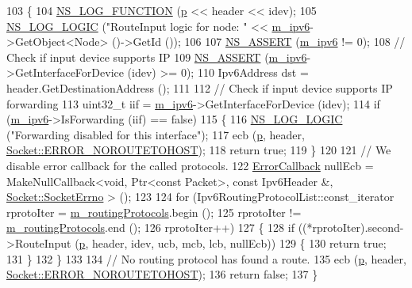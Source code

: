 \begin{DoxyCode}
103 \{
104   \hyperlink{log-macros-disabled_8h_a90b90d5bad1f39cb1b64923ea94c0761}{NS\_LOG\_FUNCTION} (\hyperlink{lte__link__budget_8m_ac9de518908a968428863f829398a4e62}{p} << header << idev);
105   \hyperlink{group__logging_ga88acd260151caf2db9c0fc84997f45ce}{NS\_LOG\_LOGIC} (\textcolor{stringliteral}{"RouteInput logic for node: "} << \hyperlink{classns3_1_1Ipv6ListRouting_af82ea298d92eb8cfcb6c7572e32b517d}{m\_ipv6}->GetObject<Node> ()->GetId ());
106 
107   \hyperlink{assert_8h_a6dccdb0de9b252f60088ce281c49d052}{NS\_ASSERT} (\hyperlink{classns3_1_1Ipv6ListRouting_af82ea298d92eb8cfcb6c7572e32b517d}{m\_ipv6} != 0);
108   \textcolor{comment}{// Check if input device supports IP}
109   \hyperlink{assert_8h_a6dccdb0de9b252f60088ce281c49d052}{NS\_ASSERT} (\hyperlink{classns3_1_1Ipv6ListRouting_af82ea298d92eb8cfcb6c7572e32b517d}{m\_ipv6}->GetInterfaceForDevice (idev) >= 0);
110   Ipv6Address dst = header.GetDestinationAddress ();
111 
112   \textcolor{comment}{// Check if input device supports IP forwarding}
113   uint32\_t iif = \hyperlink{classns3_1_1Ipv6ListRouting_af82ea298d92eb8cfcb6c7572e32b517d}{m\_ipv6}->GetInterfaceForDevice (idev);
114   \textcolor{keywordflow}{if} (\hyperlink{classns3_1_1Ipv6ListRouting_af82ea298d92eb8cfcb6c7572e32b517d}{m\_ipv6}->IsForwarding (iif) == \textcolor{keyword}{false})
115     \{
116       \hyperlink{group__logging_ga88acd260151caf2db9c0fc84997f45ce}{NS\_LOG\_LOGIC} (\textcolor{stringliteral}{"Forwarding disabled for this interface"});
117       ecb (\hyperlink{lte__link__budget_8m_ac9de518908a968428863f829398a4e62}{p}, header, \hyperlink{classns3_1_1Socket_ada1328c5ae0c28cb2a982caf8f6d6ccaa0f8ecb5a4ddbce3bade35fa12c3d49e8}{Socket::ERROR\_NOROUTETOHOST});
118       \textcolor{keywordflow}{return} \textcolor{keyword}{true};
119     \}
120 
121   \textcolor{comment}{// We disable error callback for the called protocols.}
122   \hyperlink{classns3_1_1Ipv6RoutingProtocol_abfdf43594e2ae97e1a4dc340e3a086a5}{ErrorCallback} nullEcb = MakeNullCallback<void, Ptr<const Packet>, \textcolor{keyword}{const} Ipv6Header &, 
      \hyperlink{classns3_1_1Socket_ada1328c5ae0c28cb2a982caf8f6d6cca}{Socket::SocketErrno} > ();
123 
124   \textcolor{keywordflow}{for} (Ipv6RoutingProtocolList::const\_iterator rprotoIter = \hyperlink{classns3_1_1Ipv6ListRouting_aec46de403a1c73088ce952d7cbd804e8}{m\_routingProtocols}.begin ();
125        rprotoIter != \hyperlink{classns3_1_1Ipv6ListRouting_aec46de403a1c73088ce952d7cbd804e8}{m\_routingProtocols}.end ();
126        rprotoIter++)
127     \{
128       \textcolor{keywordflow}{if} ((*rprotoIter).second->RouteInput (\hyperlink{lte__link__budget_8m_ac9de518908a968428863f829398a4e62}{p}, header, idev, ucb, mcb, lcb, nullEcb))
129         \{
130           \textcolor{keywordflow}{return} \textcolor{keyword}{true};
131         \}
132     \}
133 
134   \textcolor{comment}{// No routing protocol has found a route.}
135   ecb (\hyperlink{lte__link__budget_8m_ac9de518908a968428863f829398a4e62}{p}, header, \hyperlink{classns3_1_1Socket_ada1328c5ae0c28cb2a982caf8f6d6ccaa0f8ecb5a4ddbce3bade35fa12c3d49e8}{Socket::ERROR\_NOROUTETOHOST});
136   \textcolor{keywordflow}{return} \textcolor{keyword}{false};
137 \}
\end{DoxyCode}


